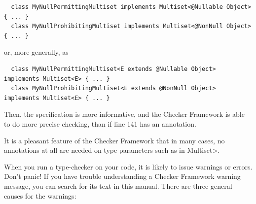 \begin{Verbatim}
  class MyNullPermittingMultiset implements Multiset<@Nullable Object> { ... }
  class MyNullProhibitingMultiset implements Multiset<@NonNull Object> { ... }
\end{Verbatim}

\noindent
or, more generally, as

\begin{Verbatim}
  class MyNullPermittingMultiset<E extends @Nullable Object> implements Multiset<E> { ... }
  class MyNullProhibitingMultiset<E extends @NonNull Object> implements Multiset<E> { ... }
\end{Verbatim}

Then, the specification is more informative, and the Checker Framework is
able to do more precise checking, than if line 141 has an annotation.

It is a pleasant feature of the Checker Framework that in many cases, no
annotations at all are needed on type parameters such as  in \<Multiset>.



When you run a type-checker on your code, it is likely to issue warnings or
errors.  Don't panic!
If you have trouble understanding a Checker Framework warning message, you
can search for its text in this manual.
There are three general causes for the warnings:


